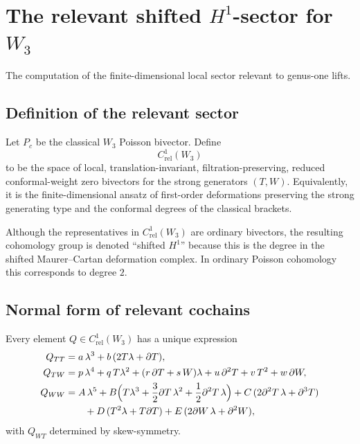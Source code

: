 \section{The relevant shifted $H^1$-sector for $W_3$}

The computation of the finite-dimensional local sector relevant to genus-one lifts.

\subsection{Definition of the relevant sector}

\begin{definition}
Let $P_c$ be the classical $W_3$ Poisson bivector. Define
\[
C^1_{\mathrm{rel}}(W_3)
\]
to be the space of local, translation-invariant, filtration-preserving, reduced conformal-weight
zero bivectors for the strong generators $(T,W)$. Equivalently, it is the finite-dimensional
ansatz of first-order deformations preserving the strong generating type and the conformal
degrees of the classical brackets.
\end{definition}

\begin{remark}
Although the representatives in $C^1_{\mathrm{rel}}(W_3)$ are ordinary
bivectors, the resulting cohomology group is denoted ``shifted $H^1$''
because this is the degree in the shifted Maurer--Cartan deformation
complex. In ordinary Poisson cohomology this corresponds to degree $2$.
\end{remark}

\subsection{Normal form of relevant cochains}

\begin{proposition}\label{prop:W3normalform}
Every element $Q\in C^1_{\mathrm{rel}}(W_3)$ has a unique expression
\begin{align}
Q_{TT}&=a\,\lambda^3+b\,(2T\lambda+\partial T),\label{eq:QTT}\\
Q_{TW}&=p\,\lambda^4+q\,T\lambda^2+(r\,\partial T+s\,W)\lambda+u\,\partial^2T+v\,T^2+w\,\partial W,\label{eq:QTW}\\
Q_{WW}&=
A\,\lambda^5
+B\Big(T\lambda^3+\frac32\partial T\,\lambda^2+\frac12\partial^2T\,\lambda\Big)
+C\,(2\partial^2T\,\lambda+\partial^3T)\notag\\
&\qquad
+D\,(T^2\lambda+T\partial T)
+E\,(2\partial W\,\lambda+\partial^2W),\label{eq:QWW}
\end{align}
with $Q_{WT}$ determined by skew-symmetry.
\end{proposition}

